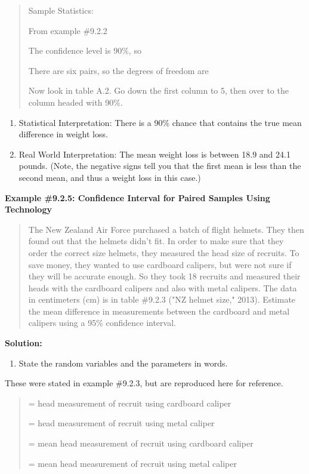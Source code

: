 \documentclass[]{book}
\providecommand{\tightlist}{%
  \setlength{\itemsep}{0pt}\setlength{\parskip}{0pt}}
\begin{document}
\begin{quote}
Sample Statistics:

From example \#9.2.2

The confidence level is 90\%, so

There are six pairs, so the degrees of freedom are

Now look in table A.2. Go down the first column to 5, then over to the
column headed with 90\%.
\end{quote}

\begin{enumerate}
\def\labelenumi{\arabic{enumi}.}
\setcounter{enumi}{3}
\item
  Statistical Interpretation: There is a 90\% chance that contains the true mean difference in weight loss.
\item
  Real World Interpretation: The mean weight loss is between 18.9 and 24.1 pounds. (Note, the negative signs tell you that the first mean is less than the second mean, and thus a weight loss in this case.)
\end{enumerate}

\textbf{Example \#9.2.5: Confidence Interval for Paired Samples Using Technology}

\begin{quote}
The New Zealand Air Force purchased a batch of flight helmets. They then found out that the helmets didn't fit. In order to make sure that they order the correct size helmets, they measured the head size of recruits. To save money, they wanted to use cardboard calipers, but were not sure if they will be accurate enough. So they took 18 recruits and measured their heads with the cardboard calipers and also with metal calipers. The data in centimeters (cm) is in table \#9.2.3 ("NZ helmet size," 2013). Estimate the mean difference in measurements between the cardboard and metal calipers using a 95\% confidence interval.
\end{quote}

\textbf{Solution:}

\begin{enumerate}
\def\labelenumi{\arabic{enumi}.}
\tightlist
\item
  State the random variables and the parameters in words.
\end{enumerate}

These were stated in example \#9.2.3, but are reproduced here for reference.

\begin{quote}
= head measurement of recruit using cardboard caliper

= head measurement of recruit using metal caliper

= mean head measurement of recruit using cardboard caliper

= mean head measurement of recruit using metal caliper
\end{quote}
\end{document}

